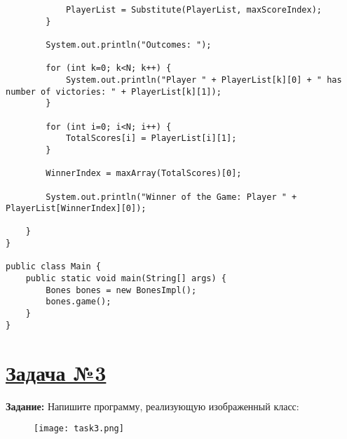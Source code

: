 \documentclass[a4paper]{article}
\begin{document}
\begin{lstlisting}
            PlayerList = Substitute(PlayerList, maxScoreIndex);
        }

        System.out.println("Outcomes: ");

        for (int k=0; k<N; k++) {
            System.out.println("Player " + PlayerList[k][0] + " has number of victories: " + PlayerList[k][1]);
        }
        
        for (int i=0; i<N; i++) {
            TotalScores[i] = PlayerList[i][1];
        }

        WinnerIndex = maxArray(TotalScores)[0];
        
        System.out.println("Winner of the Game: Player " + PlayerList[WinnerIndex][0]);

    }
}

public class Main {
    public static void main(String[] args) {
        Bones bones = new BonesImpl();
        bones.game();
    }
}

\end{lstlisting}

\newpage

\section{\href{https://github.com/yarvod/NetCracker_LearningCenter/tree/main/Practise_tasks/Practice_task_2/task_3}{Задача №3}}

\textbf{Задание: } Напишите программу, реализующую изображенный класс:

\begin{figure}[H]
    \begin{center}
        \texttt{[image: task3.png]}
    \end{center}
\end{figure}
\end{document}
